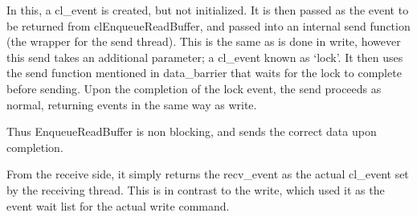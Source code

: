 \documentclass[../thesis.tex]{subfiles}
\begin{document}
            In this, a cl\_event is created, but not initialized. It is then passed as the event to be returned from clEnqueueReadBuffer, and passed into an internal send function (the wrapper for the send thread). This is the same as is done in write, however this send takes an additional parameter; a cl\_event known as `lock'. It then uses the send function mentioned in data\_barrier that waits for the lock to complete before sending. Upon the completion of the lock event, the send proceeds as normal, returning events in the same way as write.

            Thus EnqueueReadBuffer is non blocking, and sends the correct data upon completion.

            From the receive side, it simply returns the recv\_event as the actual cl\_event set by the receiving thread. This is in contrast to the write, which used it as the event wait list for the actual write command.
    

\end{document}
